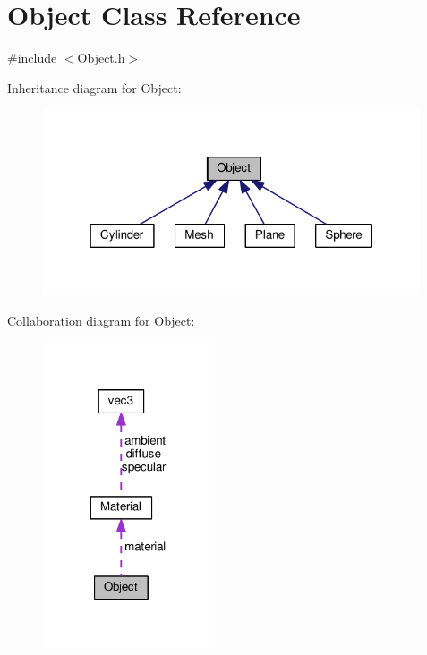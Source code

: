 \hypertarget{structObject}{}\section{Object Class Reference}
\label{structObject}


{\ttfamily \#include $<$Object.\+h$>$}



Inheritance diagram for Object\+:
\nopagebreak
\begin{figure}[H]
\begin{center}
\leavevmode
\includegraphics[width=316pt]{structObject__inherit__graph}
\end{center}
\end{figure}


Collaboration diagram for Object\+:
\nopagebreak
\begin{figure}[H]
\begin{center}
\leavevmode
\includegraphics[width=144pt]{structObject__coll__graph}
\end{center}
\end{figure}
